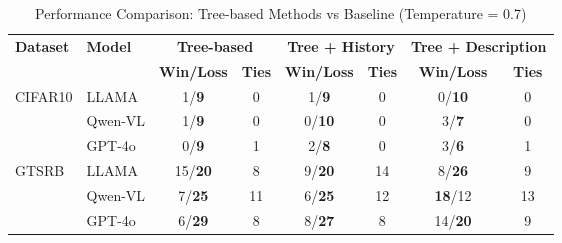 \begin{table*}[ht]
\centering
\caption{Performance Comparison: Tree-based Methods vs Baseline (Temperature = 0.7)}
\begin{tabular}{ll|cc|cc|cc}
\hline
\multirow{2}{*}{\textbf{Dataset}} & \multirow{2}{*}{\textbf{Model}}
& \multicolumn{2}{c|}{\textbf{Tree-based}}
& \multicolumn{2}{c|}{\textbf{Tree + History}}
& \multicolumn{2}{c}{\textbf{Tree + Description}} \\
\cline{3-8}
& & \textbf{Win/Loss} & \textbf{Ties} & \textbf{Win/Loss} & \textbf{Ties} & \textbf{Win/Loss} & \textbf{Ties} \\
\hline
\multirow{3}{*}{CIFAR10} & LLAMA & 1/\textbf{9} & 0 & 1/\textbf{9} & 0 & 0/\textbf{10} & 0 \\
 & Qwen-VL & 1/\textbf{9} & 0 & 0/\textbf{10} & 0 & 3/\textbf{7} & 0 \\
 & GPT-4o & 0/\textbf{9} & 1 & 2/\textbf{8} & 0 & 3/\textbf{6} & 1 \\
\hline
\multirow{3}{*}{GTSRB} & LLAMA & 15/\textbf{20} & 8 & 9/\textbf{20} & 14 & 8/\textbf{26} & 9 \\
 & Qwen-VL & 7/\textbf{25} & 11 & 6/\textbf{25} & 12 & \textbf{18}/12 & 13 \\
 & GPT-4o & 6/\textbf{29} & 8 & 8/\textbf{27} & 8 & 14/\textbf{20} & 9 \\
\hline
\end{tabular}
\label{tab:performance_comparison}
\end{table*}